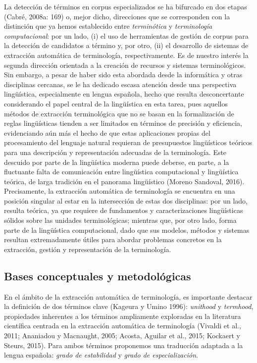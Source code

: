 La detección de términos en corpus especializados se ha bifurcado en dos etapas (Cabré, 2008a: 169) o, mejor dicho, direcciones que se corresponden con la distinción que ya hemos establecido entre \textit{terminótica} y \textit{terminología computacional}: por un lado, (i) el uso de herramientas de gestión de corpus para la detección de candidatos a término y, por otro, (ii) el desarrollo de sistemas de extracción automática de terminología, respectivamente. Es de nuestro interés la segunda dirección orientada a la creación de recursos y sistemas terminológicos. Sin embargo, a pesar de haber sido esta abordada desde la informática y otras disciplinas cercanas, se le ha dedicado escasa atención desde una perspectiva lingüística, especialmente en lengua española, hecho que resulta desconcertante considerando el papel central de la lingüística en esta tarea, pues aquellos métodos de extracción terminológica que no se basan en la formalización de reglas lingüísticas tienden a ser limitados en términos de precisión y eficiencia, evidenciando aún más el hecho de que estas aplicaciones propias del procesamiento del lenguaje natural requieran de presupuestos lingüísticos teóricos para una descripción y representación adecuadas de la terminología. Este descuido por parte de la lingüística moderna puede deberse, en parte, a la fluctuante falta de comunicación entre lingüística computacional y lingüística teórica, de larga tradición en el panorama lingüístico (Moreno Sandoval, 2016). Precisamente, la extracción automática de terminología se encuentra en una posición singular al estar en la intersección de estas dos disciplinas: por un lado, resulta teórica, ya que requiere de fundamentos y caracterizaciones lingüísticas sólidos sobre las unidades terminológicas; mientras que, por otro lado, forma parte de la lingüística computacional, dado que sus modelos, métodos y sistemas resultan extremadamente útiles para abordar problemas concretos en la extracción, gestión y representación de la terminología.

\subsection{Bases conceptuales y metodológicas} \label{subsec:ate_bases}

En el ámbito de la extracción automática de terminología, es importante destacar la definición de dos términos clave (Kageura y Umino 1996): \textit{unithood} y \textit{termhood}, propiedades inherentes a los términos ampliamente exploradas en la literatura científica centrada en la extracción automática de terminología (Vivaldi et al., 2011; Ananiadou y Macnaught, 2005; Acosta, Aguilar et al., 2015; Kockaert y Steurs, 2015). Para ambos términos proponemos una traducción adaptada a la lengua española: \emph{grado de estabilidad} y \emph{grado de especialización}.

